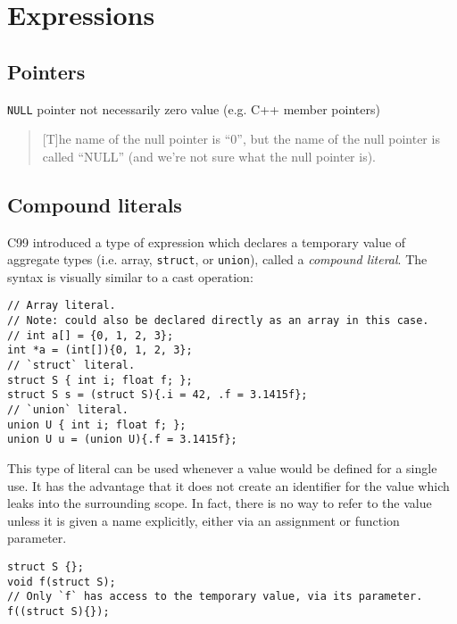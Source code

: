 \section{Expressions}

\subsection{Pointers}

\texttt{NULL} pointer not necessarily zero value (e.g. C++ member pointers)

\begin{quote}
    [T]he name of the null pointer is ``0'', but the name of the null pointer is
    called ``NULL'' (and we're not sure what the null pointer is).
\end{quote}

\cite{Summit1995}

\subsection{Compound literals}

\label{subsec:c:literals}

C99 introduced a type of expression which declares a temporary value of
aggregate types (i.e.  array, \texttt{struct}, or \texttt{union}), called a
\textit{compound literal}.  The syntax is visually similar to a cast operation:

\begin{lstlisting}[style=c]
// Array literal.
// Note: could also be declared directly as an array in this case.
// int a[] = {0, 1, 2, 3};
int *a = (int[]){0, 1, 2, 3};
// `struct` literal.
struct S { int i; float f; };
struct S s = (struct S){.i = 42, .f = 3.1415f};
// `union` literal.
union U { int i; float f; };
union U u = (union U){.f = 3.1415f};
\end{lstlisting}

This type of literal can be used whenever a value would be defined for a single
use.  It has the advantage that it does not create an identifier for the value
which leaks into the surrounding scope.  In fact, there is no way to refer to
the value unless it is given a name explicitly, either via an assignment or
function parameter.

\begin{lstlisting}[style=c]
struct S {};
void f(struct S);
// Only `f` has access to the temporary value, via its parameter.
f((struct S){});
\end{lstlisting}

